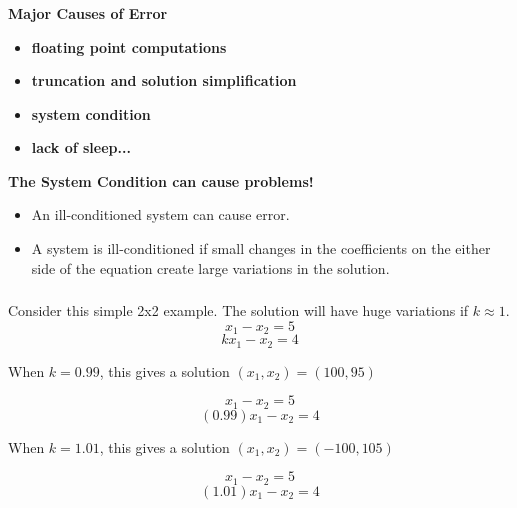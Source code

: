 \documentclass[fleqn]{beamer} %
\newcommand{\sectionIIIsubsectionIVtitle}{}
\begin{document}
			\begin{frame}
				\frametitle{\sectionIIIsubsectionIVtitle} \small
				\bigskip

				\textbf{Major Causes of Error} \\
				\begin{itemize}
					\item \textbf{floating point computations} \vspace{3mm}\\
					\item \textbf{truncation and solution simplification} \vspace{3mm}\\
					\item \textbf{system condition} \vspace{3mm}\\
					\item \textbf{lack of sleep...} \vspace{3mm}\\
				\end{itemize}
				
				\textbf{ The {\BL System Condition} can cause problems!} \\
				\begin{itemize}
				\item An {\PR ill-conditioned} system can cause error. \\
				\item A system is {\PR ill-conditioned} if small changes in the coefficients on the either side of the equation create large variations in the solution.\\
				\end{itemize}

				\btVFill
			\end{frame}	

			\begin{frame}
				\frametitle{\sectionIIIsubsectionIVtitle}
				\bigskip

				\begin{fleqn}
				  
				  	Consider this simple 2x2 example. The solution will have huge variations if $ k\approx 1 $. \\
				
					\[x_1 - x_2=5\] 
					\[kx_1 - x_2=4\]
				
				  	When $ k = 0.99 $, this gives a solution $(x_1,x_2)=(100, 95)$	
				
					\[x_1 - x_2=5\] 
					\[(0.99)x_1 - x_2=4\]
				
				 	When $ k = 1.01 $, this gives a solution $(x_1,x_2)=(-100, 105)$	
				
					\[x_1 - x_2=5\] 
					\[(1.01)x_1 - x_2=4\]
					
				\end{fleqn}

				\btVFill
			\end{frame}	
	
\end{document}
